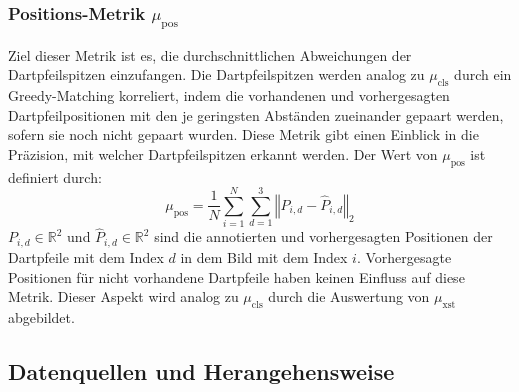 \subsubsection{Positions-Metrik $\mu_\text{pos}$}

Ziel dieser Metrik ist es, die durchschnittlichen Abweichungen der Dartpfeilspitzen einzufangen. Die Dartpfeilspitzen werden analog zu $\mu_\text{cls}$ durch ein Greedy-Matching korreliert, indem die vorhandenen und vorhergesagten Dartpfeilpositionen mit den je geringsten Abständen zueinander gepaart werden, sofern sie noch nicht gepaart wurden. Diese Metrik gibt einen Einblick in die Präzision, mit welcher Dartpfeilspitzen erkannt werden. Der Wert von $\mu_\text{pos}$ ist definiert durch:
\begin{equation*}
    \mu_\text{pos} = \frac{1}{N} \sum_{i=1}^{N} \sum_{d=1}^{3} \left\Vert P_{i, d} - \widehat{P}_{i, d} \right\Vert _2
\end{equation*}
$P_{i, d} \in \mathbb{R}^2$ und $\widehat{P}_{i, d} \in \mathbb{R}^2$ sind die annotierten und vorhergesagten Positionen der Dartpfeile mit dem Index $d$ in dem Bild mit dem Index $i$. Vorhergesagte Positionen für nicht vorhandene Dartpfeile haben keinen Einfluss auf diese Metrik. Dieser Aspekt wird analog zu $\mu_\text{cls}$ durch die Auswertung von $\mu_\text{xst}$ abgebildet.


\newpage
\subsection{Datenquellen und Herangehensweise}
\label{sec:nn_datenquellen}

